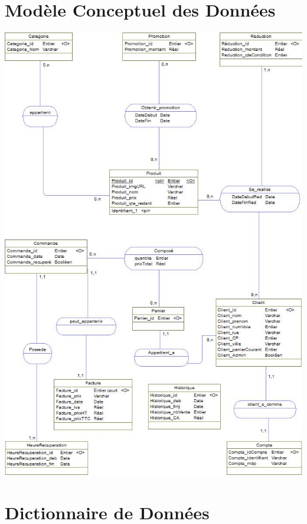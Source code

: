 \documentclass[12pt]{report}
\begin{document}
\begin{spacing}{1.2}
\chapter{Modèle Conceptuel des Données}
\newpage
\centerline{\includegraphics{mcd.jpg}}
\chapter{Dictionnaire de Données}


\end{spacing}
\end{document}
